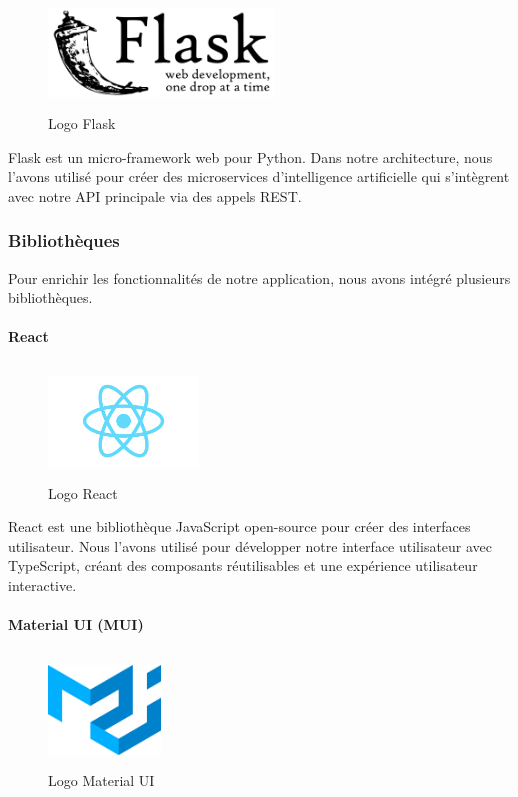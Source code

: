 \begin{figure}[H]
    \centering
    \includegraphics[width=6cm, height=3cm]{images/flask.png}
    \caption{Logo Flask}
\end{figure}

\noindent Flask est un micro-framework web pour Python. Dans notre architecture, nous l'avons utilisé pour créer des microservices d'intelligence artificielle qui s'intègrent avec notre API principale via des appels REST.

\subsubsection{Bibliothèques}

\noindent Pour enrichir les fonctionnalités de notre application, nous avons intégré plusieurs bibliothèques.

\paragraph{React}

\begin{figure}[H]
    \centering
    \includegraphics[width=4cm, height=3cm]{images/react.png}
    \caption{Logo React}
\end{figure}

\noindent React est une bibliothèque JavaScript open-source pour créer des interfaces utilisateur. Nous l'avons utilisé pour développer notre interface utilisateur avec TypeScript, créant des composants réutilisables et une expérience utilisateur interactive.

\paragraph{Material UI (MUI)}

\begin{figure}[H]
    \centering
    \includegraphics[width=3cm, height=3cm]{images/mui.png}
    \caption{Logo Material UI}
\end{figure}

